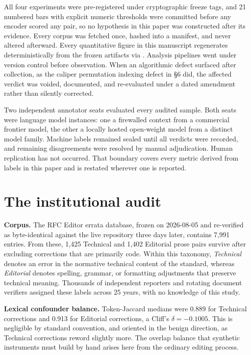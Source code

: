 \documentclass[11pt]{article}
\begin{document}
All four experiments were pre-registered under cryptographic freeze tags, and 21 numbered bars with explicit numeric thresholds were committed before any encoder scored any pair, so no hypothesis in this paper was constructed after its evidence. Every corpus was fetched once, hashed into a manifest, and never altered afterward. Every quantitative figure in this manuscript regenerates deterministically from the frozen artifacts via . Analysis pipelines went under version control before observation. When an algorithmic defect surfaced after collection, as the caliper permutation indexing defect in \S6 did, the affected verdict was voided, documented, and re-evaluated under a dated amendment rather than silently corrected.

Two independent annotator seats evaluated every audited sample. Both seats were language model instances: one a firewalled context from a commercial frontier model, the other a locally hosted open-weight model from a distinct model family. Machine labels remained sealed until all verdicts were recorded, and remaining disagreements were resolved by manual adjudication. Human replication has not occurred. That boundary covers every metric derived from labels in this paper and is restated wherever one is reported.

\section{The institutional audit}

\textbf{Corpus.} The RFC Editor errata database, frozen on 2026-08-05 and re-verified as byte-identical against the live repository three days later, contains 7,991 entries. From these, 1,425 Technical and 1,402 Editorial prose pairs survive after excluding corrections that are primarily code. Within this taxonomy, \emph{Technical} denotes an error in the normative technical content of the standard, whereas \emph{Editorial} denotes spelling, grammar, or formatting adjustments that preserve technical meaning. Thousands of independent reporters and rotating document verifiers assigned these labels across 25 years, with no knowledge of this study.

\textbf{Lexical confounder balance.} Token-Jaccard medians were 0.889 for Technical corrections and 0.913 for Editorial corrections, a Cliff's $\delta = -0.1005$. This is negligible by standard convention, and oriented in the benign direction, as Technical corrections reword slightly more. The overlap balance that synthetic instruments must build by hand arises here from the ordinary editing process.
\end{document}
